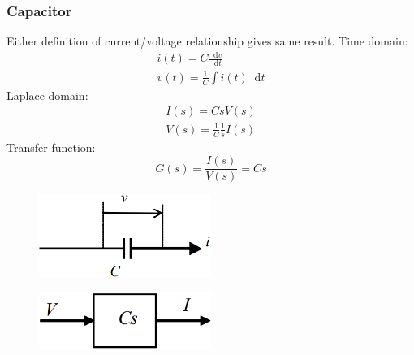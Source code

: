 \documentclass[class=report, crop=false, 12pt,a4paper, tikz, border=4mm]{standalone}
\newcommand{\dif}{\mathop{}\!\mathrm{d}}
\begin{document}
\subsubsection{Capacitor}
Either definition of current/voltage relationship gives same result. Time domain:
\begin{gather}
  i(t) = C\frac{\dif v}{\dif t}\\
  v(t) = \frac{1}{C}\int i(t) \dif t
\end{gather}
Laplace domain:
\begin{gather}
  I(s) = CsV(s)\\
  V(s) = \frac{1}{C} \frac{1}{s} I(s)
\end{gather}
Transfer function:
\begin{equation}
  G(s) = \frac{I(s)}{V(s)} = Cs
\end{equation}
\begin{figure}[H]
  \centering
  \includegraphics[width = 0.5\textwidth]{../img/diagram6.png}
\end{figure}
\begin{figure}[H]
  \centering
  \includegraphics[width = 0.5\textwidth]{../img/blockdiagram17.png}
\end{figure}
\end{document}
